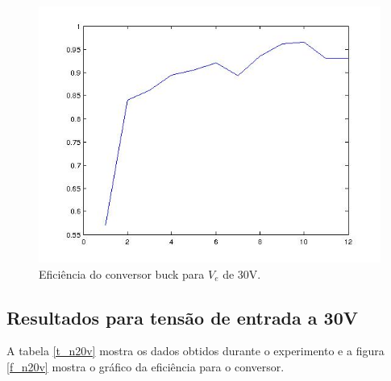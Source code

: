 \begin{figure}[H]
	\centering
	\includegraphics[scale=0.5]{Imagens/n30v.jpg}
	\caption{Eficiência do conversor buck para $V_e$ de 30V.}
	\label{f_n30v}
\end{figure}

\subsection{Resultados para tensão de entrada a 30V}

A tabela \ref{t_n20v} mostra os dados obtidos durante o experimento e a figura \ref{f_n20v} mostra o gráfico da eficiência para o conversor.

